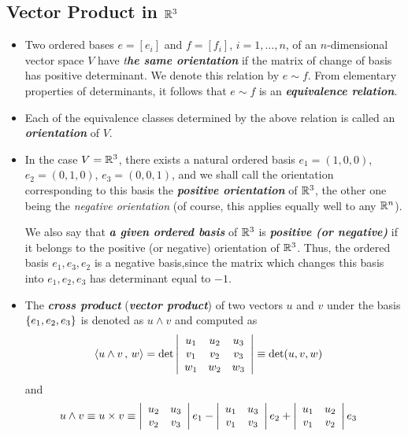 \documentclass[11pt]{article}
\begin{document}
\subsection{Vector Product in ${\mathbb R}^3$}
\begin{itemize}
\item Two ordered bases $e = [e_i]$ and $f = [f_i]$, $i = 1,\ldots,n$, of an $n$-dimensional vector space $V$ have \emph{t\textbf{he same orientation}} if the matrix of change of basis has positive determinant. We denote this relation by $e \sim f$. From elementary properties of determinants, it follows that $e \sim f$ is an \emph{\textbf{equivalence relation}}.

\item Each of the equivalence classes determined by the above relation is called an \emph{\textbf{orientation}} of $V$.

\item In the case $V = {\mathbb R}^3$, there exists a natural ordered basis $e_1 = (1, 0, 0)$, $e_2 = (0, 1, 0)$, $e_3 = (0, 0, 1)$, and we shall call the orientation corresponding to this basis the \emph{\textbf{positive orientation}} of ${\mathbb R}^3$, the other one being the \emph{negative orientation} (of course, this applies equally well to any ${\mathbb R}^n$). 

We also say that \emph{\textbf{a given ordered basis}} of ${\mathbb R}^3$ is \emph{\textbf{positive (or negative)}} if it belongs to the positive (or negative) orientation of ${\mathbb R}^3$. Thus, the ordered basis $e_1, e_3, e_2$ is a negative basis,since the matrix which changes this basis into $e_1,e_2,e_3$ has determinant equal to $-1$.

\item The \emph{\textbf{cross product}} (\emph{\textbf{vector product}}) of two vectors $u$ and $v$ under the basis $\left\{e_{1}, e_{2}, e_{3}\right\}$ is denoted as $u\wedge v$ and computed as
\begin{align}
\left\langle u\wedge v\,,\, w \right\rangle &= \det\left\lvert \begin{array}{ccc}
u_{1} & u_{2} & u_{3} \\ 
v_{1} & v_{2} & v_{3} \\ 
w_{1} & w_{2} & w_{3}
\end{array}  \right\rvert  \equiv \det(u, v, w)\label{eqn: cross_prod}
\end{align}
and
\begin{align}
u\wedge v \equiv u \times v &\equiv \left\lvert \begin{array}{cc}
u_{2} & u_{3} \\ 
v_{2} & v_{3}
\end{array}  \right\rvert e_{1}
- 
\left\lvert \begin{array}{cc}
u_{1} & u_{3} \\ 
v_{1} & v_{3}
\end{array}  \right\rvert e_{2}
+
\left\lvert \begin{array}{cc}
u_{1} & u_{2} \\ 
v_{1} & v_{2}
\end{array}  \right\rvert e_{3}  \label{eqn: cross_prod2}
\end{align}


\end{itemize}
\end{document}

